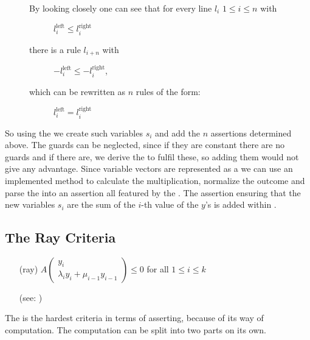 \begin{figure}[H]
	\vspace*{1em}
	By looking closely one can see that for every line $l_i$ $1 \le i \le n$ with 
	\begin{figure}[H]
		\centering
		$l^{\text{left}}_i \le l^{\text{right}}_i$
	\end{figure} 
	there is a rule $l_{i+n}$ with 
	\begin{figure}[H]
		\centering
		$-l^{\text{left}}_i \le -l^{\text{right}}_i$,
	\end{figure}
	which can be rewritten as $n$ rules of the form: 
	\begin{figure}[H]
		\centering
		$l^{\text{left}}_i = l^{\text{right}}_i$
	\end{figure}	
\end{figure}
So using the \smtfactory we create such variables $s_i$ and add the $n$ assertions determined above. The guards can be neglected, since if they are constant there are no guards and if there are, we derive the \stem to fulfil these, so adding them would not give any advantage.\newline
Since variable vectors are represented as a \rpntree we can use an implemented method to calculate the multiplication, normalize the outcome and parse the \rpntree into an assertion all featured by the \smtfactory. \newline
The assertion ensuring that the new variables $s_i$ are the sum of the $i$-th value of the $y$'s is added within .


\subsection{The Ray Criteria}
\label{sec:ray-criteria}
\begin{itemize}
	\setlength{\itemindent}{1in}
	\item[(ray)] $A\begin{pmatrix} y_i \\ \lambda_i y_i + \mu_{i-1} y_{i-1} \end{pmatrix} \le 0$ for all $1 \le i \le k$
	\item[] (see: )
\end{itemize}
The \rayc is the hardest criteria in terms of asserting, because of its way of computation. \newline
The computation can be split into two parts on its own.
